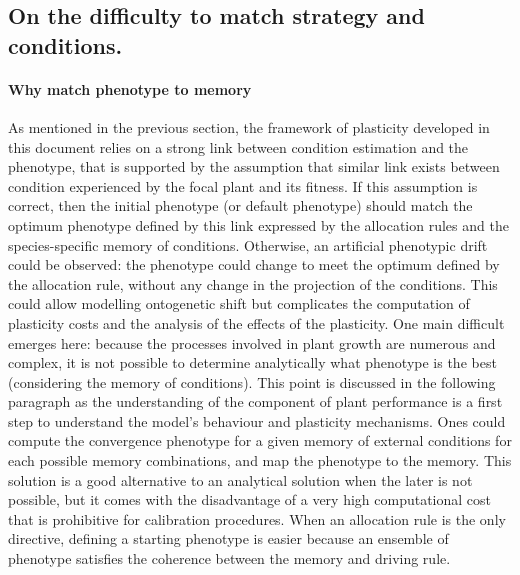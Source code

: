 

\subsection{On the difficulty to match strategy and conditions.}\label{subsection:match}

\paragraph{Why match phenotype to memory}

As mentioned in the previous section, the framework of plasticity developed in this document relies on a strong link between condition estimation and the phenotype, that is supported by the assumption that similar link exists between condition experienced by the focal plant and its fitness. If this assumption is correct, then the initial phenotype (or default phenotype) should match the optimum phenotype defined by this link expressed by the allocation rules and the species-specific memory of conditions. Otherwise, an artificial phenotypic drift could be observed: the phenotype could change to meet the optimum defined by the allocation rule, without any change in the projection of the conditions. This could allow modelling ontogenetic shift but complicates the computation of plasticity costs and the analysis of the effects of the plasticity. One main difficult emerges here: because the processes involved in plant growth are numerous and complex, it is not possible to determine analytically what phenotype is the best (considering the memory of conditions). This point is discussed in the following paragraph as the understanding of the component of plant performance is a first step to understand the model's behaviour and plasticity mechanisms. Ones could compute the convergence phenotype for a given memory of external conditions for each possible memory combinations, and map the phenotype to the memory.
This solution is a good alternative to an analytical solution when the later is not possible, but it comes with the disadvantage of a very high computational cost that is prohibitive for calibration procedures.
When an allocation rule is the only directive, defining a starting phenotype is easier because an ensemble of phenotype satisfies the coherence between the memory and driving rule.

